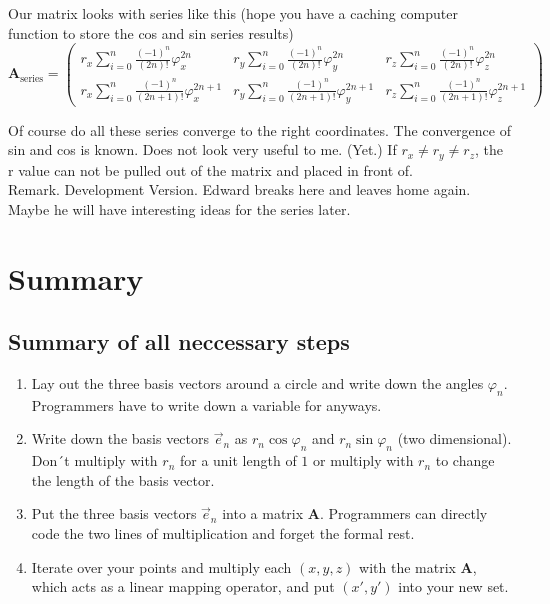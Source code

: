 \documentclass[a4paper]{article}
\begin{document}
\begin{Example}
Our matrix looks with series like this (hope you have a caching computer function to store the cos and sin series results)
\begin{displaymath}
\boldsymbol{A}_{\text{series}} = \begin{pmatrix}
r_x\sum_{i=0}^{n}\frac{(-1)^{n}}{(2n)!}\varphi_{x}^{2n}&
r_y\sum_{i=0}^{n}\frac{(-1)^{n}}{(2n)!}\varphi_{y}^{2n}&
r_z\sum_{i=0}^{n}\frac{(-1)^{n}}{(2n)!}\varphi_{z}^{2n}\\
r_x\sum_{i=0}^{n}\frac{(-1)^{n}}{(2n+1)!}\varphi_{x}^{2n+1}&
r_y\sum_{i=0}^{n}\frac{(-1)^{n}}{(2n+1)!}\varphi_{y}^{2n+1}&
r_z\sum_{i=0}^{n}\frac{(-1)^{n}}{(2n+1)!}\varphi_{z}^{2n+1}
\end{pmatrix}
\end{displaymath}

Of course do all these series converge to the right coordinates. The convergence of sin and cos is known.
Does not look very useful to me. (Yet.)
If $r_x \neq r_y \neq r_z$, the r value can not be pulled out of the matrix and placed in front of.\\

Remark. Development Version. Edward breaks here and leaves home again. Maybe he will have interesting ideas for the series later.\\

\section{Summary}

\subsection{Summary of all neccessary steps}
\begin{enumerate}
\item Lay out the three basis vectors around a circle and write down the angles $\varphi_{n}$. Programmers have to write down a variable for anyways.
\item Write down the basis vectors $\vec{e}_{n}$ as $r_{n} \cos \varphi_{n}$ and $r_{n} \sin \varphi_{n}$ (two dimensional). Don´t multiply with $r_{n}$ for a unit length of $1$ or multiply with $r_{n}$ to change the length of the basis vector.
\item Put the three basis vectors $\vec{e}_{n}$ into a matrix $\boldsymbol{A}$. Programmers can directly code the two lines of multiplication and forget the formal rest.
\item Iterate over your points and multiply each $(x,y,z)$ with the matrix $\boldsymbol{A}$, which acts as a linear mapping operator, and put $(x',y')$ into your new set.
\end{enumerate}


\end{Example}
\end{document}
